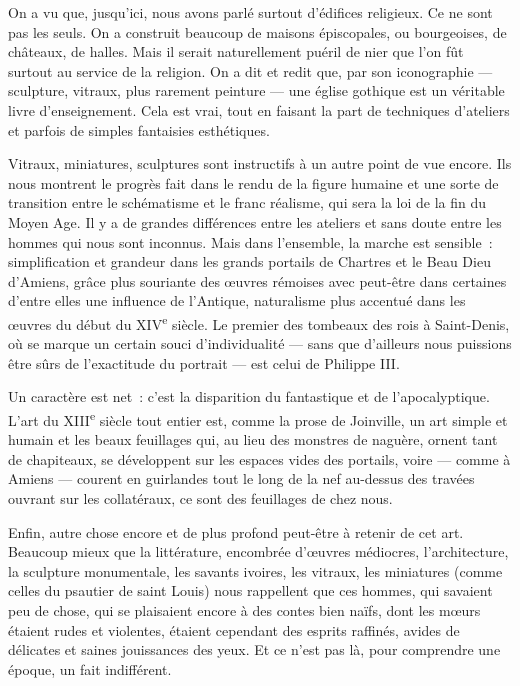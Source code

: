 \documentclass[french,twoside]{book} %
\begin{document}
On a vu que, jusqu’ici, nous avons parlé surtout d’édifices religieux. Ce ne sont pas les seuls. On a construit beaucoup de maisons épiscopales, ou bourgeoises, de châteaux, de halles. Mais il serait naturellement puéril de nier que l’on fût surtout au service de la religion. On a dit et redit que, par son iconographie — sculpture, vitraux, plus rarement peinture — une église gothique est un véritable livre d’enseignement. Cela est vrai, tout en faisant la part de techniques d’ateliers et parfois de simples fantaisies esthétiques.\par
Vitraux, miniatures, sculptures sont instructifs à un autre point de vue encore. Ils nous montrent le progrès fait dans le rendu de la figure humaine et une sorte de transition entre le schématisme et le franc réalisme, qui sera la loi de la fin du Moyen Age. Il y a de grandes différences entre les ateliers et sans doute entre les hommes qui nous sont inconnus. Mais dans l’ensemble, la marche est sensible : simplification et grandeur dans les grands portails de Chartres et le Beau Dieu d’Amiens, grâce plus souriante des œuvres rémoises avec peut-être dans certaines d’entre elles une influence de l’Antique, naturalisme plus accentué dans les œuvres du début du XIV\textsuperscript{e} siècle. Le premier des tombeaux des rois à Saint-Denis, où se marque un certain souci d’individualité — sans que d’ailleurs nous puissions être sûrs de l’exactitude du portrait — est celui de Philippe III.\par
Un caractère est net : c’est la disparition du fantastique et de l’apocalyptique. L’art du XIII\textsuperscript{e} siècle tout entier est, comme la prose de Joinville, un art simple et humain et les beaux feuillages qui, au lieu des monstres de naguère, ornent tant de chapiteaux, se développent sur les espaces vides des portails, voire — comme à Amiens — courent en guirlandes tout le long de la nef au-dessus des travées ouvrant sur les collatéraux, ce sont des feuillages de chez nous.\par
Enfin, autre chose encore et de plus profond peut-être à retenir de cet art. Beaucoup mieux que la littérature, encombrée d’œuvres médiocres, l’architecture, la sculpture monumentale, les savants ivoires, les vitraux, les miniatures (comme celles du psautier de saint Louis) nous rappellent que ces hommes, qui savaient peu de chose, qui se plaisaient encore à des contes bien naïfs, dont les mœurs étaient rudes et violentes, étaient cependant des esprits raffinés, avides de délicates et saines jouissances des yeux. Et ce n’est pas là, pour comprendre une époque, un fait indifférent.
\end{document}
